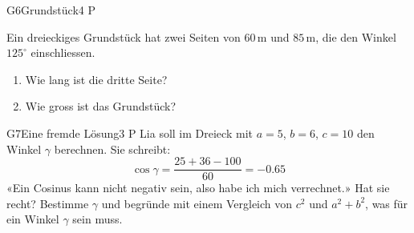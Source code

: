 \documentclass[11pt]{article}
\begin{document}
\begin{lpaufgabe}{G6}{Grundstück}{4 P}
\begin{minipage}[t]{0.55\linewidth}\vspace{0pt}
Ein dreieckiges Grundstück hat zwei Seiten von $60\,\text{m}$ und $85\,\text{m}$, die den Winkel $125^\circ$ einschliessen.
\begin{enumerate}[label=(\alph*),leftmargin=*,itemsep=2pt]
\item Wie lang ist die dritte Seite?
\item Wie gross ist das Grundstück?
\end{enumerate}
\end{minipage}\hfill
\begin{minipage}[t]{0.40\linewidth}\vspace{0pt}\centering
{}
\end{minipage}
\end{lpaufgabe}

\begin{lpaufgabe}{G7}{Eine fremde Lösung}{3 P}
Lia soll im Dreieck mit $a = 5$, $b = 6$, $c = 10$ den Winkel $\gamma$ berechnen. Sie schreibt:
\[ \cos\gamma = \frac{25 + 36 - 100}{60} = -0.65 \]
«Ein Cosinus kann nicht negativ sein, also habe ich mich verrechnet.» Hat sie recht? Bestimme $\gamma$ und begründe mit einem Vergleich von $c^2$ und $a^2 + b^2$, was für ein Winkel $\gamma$ sein muss.
\end{lpaufgabe}
\end{document}
